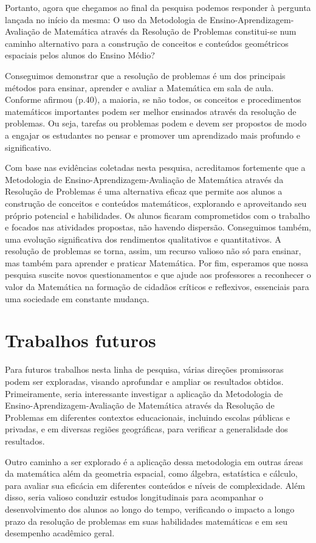 Portanto, agora que chegamos ao final da pesquisa podemos responder à pergunta lançada no início da mesma: O uso da Metodologia de Ensino-Aprendizagem-Avaliação de Matemática através da Resolução de Problemas constitui-se num caminho alternativo para a construção de conceitos e conteúdos geométricos espaciais pelos alunos do Ensino Médio?

Conseguimos demonstrar que a resolução de problemas é um dos principais métodos para ensinar, aprender e avaliar a Matemática em sala de aula. Conforme afirmou  (p.40), a maioria, se não todos, os conceitos e procedimentos matemáticos importantes podem ser melhor ensinados através da resolução de problemas. Ou seja, tarefas ou problemas podem e devem ser propostos de modo a engajar os estudantes no pensar e promover um aprendizado mais profundo e significativo.

Com base nas evidências coletadas nesta pesquisa, acreditamos fortemente que a Metodologia de Ensino-Aprendizagem-Avaliação de Matemática através da Resolução de Problemas é uma alternativa eficaz que permite aos alunos a construção de conceitos e conteúdos matemáticos, explorando e aproveitando seu próprio potencial e habilidades. Os alunos ficaram comprometidos com o trabalho e focados nas atividades propostas, não havendo dispersão. Conseguimos também, uma evolução significativa dos rendimentos qualitativos e quantitativos. A resolução de problemas se torna, assim, um recurso valioso não só para ensinar, mas também para aprender e praticar Matemática. Por fim, esperamos que nossa pesquisa suscite novos questionamentos e que ajude aos professores a reconhecer o valor da Matemática na formação de cidadãos críticos e reflexivos, essenciais para uma sociedade em constante mudança.

\section{Trabalhos futuros}

Para futuros trabalhos nesta linha de pesquisa, várias direções promissoras podem ser exploradas, visando aprofundar e ampliar os resultados obtidos. Primeiramente, seria interessante investigar a aplicação da Metodologia de Ensino-Aprendizagem-Avaliação de Matemática através da Resolução de Problemas em diferentes contextos educacionais, incluindo escolas públicas e privadas, e em diversas regiões geográficas, para verificar a generalidade dos resultados.

Outro caminho a ser explorado é a aplicação dessa metodologia em outras áreas da matemática além da geometria espacial, como álgebra, estatística e cálculo, para avaliar sua eficácia em diferentes conteúdos e níveis de complexidade. Além disso, seria valioso conduzir estudos longitudinais para acompanhar o desenvolvimento dos alunos ao longo do tempo, verificando o impacto a longo prazo da resolução de problemas em suas habilidades matemáticas e em seu desempenho acadêmico geral.

